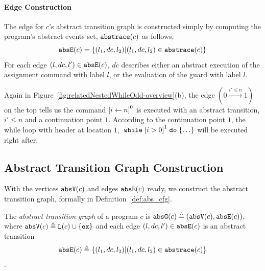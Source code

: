 \paragraph{Edge Construction}
The edge for $c$'s abstract transition graph is constructed simply by computing the program's abstract events set, $\mathtt{abs}{\mathtt{trace}}(c)$ as follows,
 \[
 \mathtt{abs}{\mathtt{E}}(c) = \{(l_1, dc, l_2) | (l_1, dc, l_2) \in \mathtt{abs}{\mathtt{trace}}(c)\}
 \]
For each edge $(l, dc, l') \in \mathtt{abs}{\mathtt{E}}(c)$, $dc$ describes either an abstract execution of the assignment command with label $l$,
or the evaluation of the guard with label $l$.
%

Again in Figure~\ref{fig:relatedNestedWhileOdd-overview}(b),
the edge $(0 \xrightarrow{i' \leq n} 1)$ on the top tells us the command 
$\clabel{\assign{i}{n}}^0$ is executed with an abstract transition, $i' \leq n$ and a continuation point $1$. 
According to the continuation point $1$, the while loop with header at location $1$, $\ewhile \clabel{i > 0}^1 \edo \{\ldots\}$ will be executed right after.

\subsection{Abstract Transition Graph Construction} 
With the vertices $\mathtt{abs}{\mathtt{V}}(c)$ and edges $\mathtt{abs}{\mathtt{E}}(c)$ ready, we construct the abstract transition graph, formally in
Definition~\ref{def:abs_cfg}.
%
\begin{defn}
 \label{def:psRB-abs_cfg}
 The \emph{abstract transition graph} of a program $c$ is $\mathtt{abs}{\mathtt{G}}(c) \triangleq (\mathtt{abs}{\mathtt{V}}(c), \mathtt{abs}{\mathtt{E}}(c))$, where
 $\mathtt{abs}{\mathtt{V}}(c) \triangleq \mathtt{L}(c)\cup\{\mathtt{ex}\}$
 and each edge $(l, dc, l') \in \mathtt{abs}{\mathtt{E}}(c)$ is an abstract transition
 $$\mathtt{abs}{\mathtt{E}}(c) \triangleq \{(l_1, dc, l_2) | (l_1, dc, l_2) \in \mathtt{abs}{\mathtt{trace}}(c)\}$$.
\end{defn}

